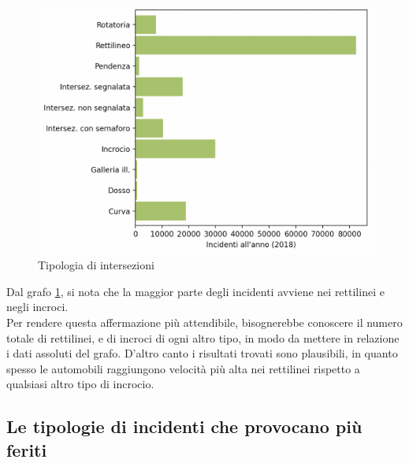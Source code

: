 \documentclass[a4paper]{report}
\begin{document}
\begin{figure}
    \includegraphics[width=\linewidth]{../src/incidenti/incidenti_senza_coords/localizzazione_incidente/intersezioni.png}
    \caption{Tipologia di intersezioni}
    \label{fig:tipo-intersezioni}
\end{figure}

Dal grafo \ref{fig:tipo-intersezioni}, 
si nota che la maggior parte degli incidenti avviene nei rettilinei e negli incroci.\\
Per rendere questa affermazione più attendibile, 
bisognerebbe conoscere il numero totale di rettilinei, e di incroci di ogni altro tipo, in 
modo da mettere in relazione i dati assoluti del grafo. 
D'altro canto i risultati trovati sono plausibili, in quanto spesso le automobili raggiungono 
velocità più alta nei rettilinei rispetto a qualsiasi altro tipo di incrocio.

\subsection{Le tipologie di incidenti che provocano più feriti}
\end{document}
